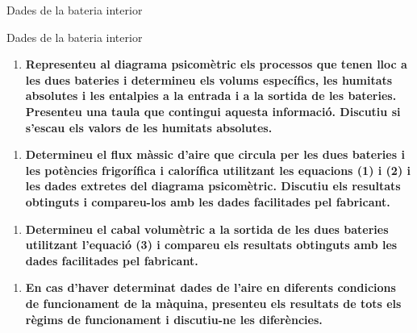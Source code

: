 \documentclass[a4paper]{article}
\newenvironment{questionenum}{%
	\setlist[enumerate]{resume}
	\restartlist{enumerate}
	\newcommand{\question}[1]{
		\begin{enumerate}
			\item\bfseries ##1
		\end{enumerate}
}}{%
}
\begin{document}
\begin{questionenum}
	\begin{table}[H]
		\begin{minipage}[t]{0.48\textwidth}
			\centering
			\caption{Dades de la bateria interior}
		\end{minipage}
		\begin{minipage}[t]{0.48\textwidth}
			\centering
			\caption{Dades de la bateria interior}
		\end{minipage}
	\end{table}

	\question{Representeu al diagrama psicomètric els processos que tenen lloc a les dues bateries i determineu els volums específics, les humitats absolutes i les entalpies a la entrada i a la sortida de les bateries. Presenteu una taula que contingui aquesta informació. Discutiu si s'escau els valors de les humitats absolutes.}
	
	\question{Determineu el flux màssic d'aire que circula per les dues bateries i les potències frigorífica i calorífica utilitzant les equacions (1) i (2) i les dades extretes del diagrama psicomètric. Discutiu els resultats obtinguts i compareu-los amb les dades facilitades pel fabricant.}
	
	\question{Determineu el cabal volumètric a la sortida de les dues bateries utilitzant l'equació (3) i compareu els resultats obtinguts amb les dades facilitades pel fabricant.}
	
	\question{En cas d'haver determinat dades de l'aire en diferents condicions de funcionament de la màquina, presenteu els resultats de tots els règims de funcionament i discutiu-ne les diferències.}
\end{questionenum}
\end{document}
